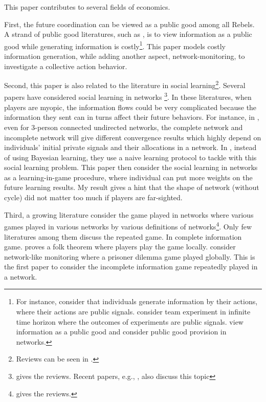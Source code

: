 \documentclass[12pt,letter]{article}
\theoremstyle{definition}
\theoremstyle{remark}
\theoremstyle{claim}
\begin{document}
This paper contributes to several fields of economics. 

First, the future coordination can be viewed as a public good among all Rebels. A strand of public good literatures, such as \citep{Lohmann1994}, is to view information as a public good while generating information is costly\footnote{For instance, \citep{Lohmann1993}\citep{Lohmann1994} consider that individuals generate information by their actions, where their actions are public signals. \citep{Bolton1999} consider team experiment in infinite time horizon where the outcomes of experiments are public signals. \citep{Bramoulle2007} view information as a public good and consider public good provision in networks.}. This paper models costly information generation, while adding another aspect, network-monitoring, to investigate a collective action behavior.

Second, this paper is also related to the literature in social learning\footnote{Reviews can be seen in \citep{Bikhchandani1998} \citep{Cao2001}.}. Several papers have considered social learning in networks \footnote{\citep{Goyal2012} gives the reviews. Recent papers, e.g., \citep{Acemoglu2011}\citep{Chatterjee2011}, also discuss this topic}. In these literatures, when players are myopic, the information flows could be very complicated because the information they sent can in turns affect their future behaviors. For instance, in \citep{RePEc:eee:gamebe:v:45:y:2003:i:2:p:329-346},  even for 3-person connected undirected networks, the complete network and incomplete network will give different convergence results which highly depend on individuals' initial private signals and their allocations in a network. In \citep{Golub2010}, instead of using Bayesian learning, they use a naive learning protocol to tackle with this social learning problem. This paper then consider the social learning in networks as a learning-in-game procedure, where individual can put more weights on the future learning results. My result gives a hint that the shape of network (without cycle) did not matter too much if players are far-sighted.

Third, a growing literature consider the game played in networks where various games played in various networks by various definitions of networks\footnote{\citep{Jackson2008}\citep{Goyal2012} gives the reviews.}. Only few literatures among them discuss the repeated game. In complete information game. \citep{Laclau2012} proves a folk theorem where players play the game locally. \citep{Wolitzky2013} \citep{Wolitzky2014} consider network-like monitoring where a prisoner dilemma game played globally. This is the first paper to consider the incomplete information game repeatedly played in a network. 
\end{document}
